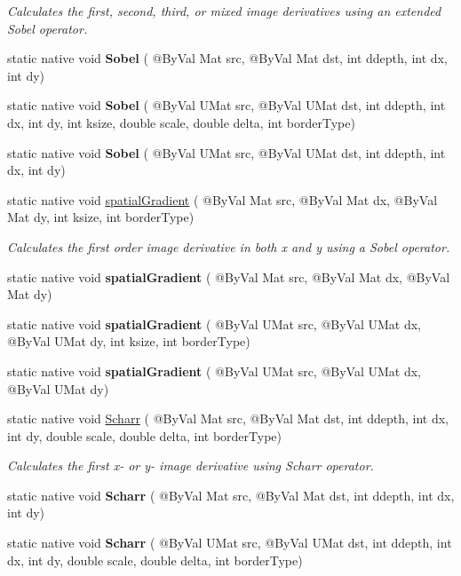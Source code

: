 \begin{DoxyCompactItemize}
\begin{DoxyCompactList}\small\item\em Calculates the first, second, third, or mixed image derivatives using an extended Sobel operator. \end{DoxyCompactList}\item 
static native void {\bfseries Sobel} ( @By\+Val Mat src, @By\+Val Mat dst, int ddepth, int dx, int dy)
\item 
static native void {\bfseries Sobel} ( @By\+Val U\+Mat src, @By\+Val U\+Mat dst, int ddepth, int dx, int dy, int ksize, double scale, double delta, int border\+Type)
\item 
static native void {\bfseries Sobel} ( @By\+Val U\+Mat src, @By\+Val U\+Mat dst, int ddepth, int dx, int dy)
\item 
static native void \hyperlink{group__imgproc__filter_ga9263e9262b1d9a29e4dc3180d4ee2683}{spatial\+Gradient} ( @By\+Val Mat src, @By\+Val Mat dx, @By\+Val Mat dy, int ksize, int border\+Type)
\begin{DoxyCompactList}\small\item\em Calculates the first order image derivative in both x and y using a Sobel operator. \end{DoxyCompactList}\item 
static native void {\bfseries spatial\+Gradient} ( @By\+Val Mat src, @By\+Val Mat dx, @By\+Val Mat dy)
\item 
static native void {\bfseries spatial\+Gradient} ( @By\+Val U\+Mat src, @By\+Val U\+Mat dx, @By\+Val U\+Mat dy, int ksize, int border\+Type)
\item 
static native void {\bfseries spatial\+Gradient} ( @By\+Val U\+Mat src, @By\+Val U\+Mat dx, @By\+Val U\+Mat dy)
\item 
static native void \hyperlink{group__imgproc__filter_gabd4c276a8055604be5e13e061eee74a1}{Scharr} ( @By\+Val Mat src, @By\+Val Mat dst, int ddepth, int dx, int dy, double scale, double delta, int border\+Type)
\begin{DoxyCompactList}\small\item\em Calculates the first x-\/ or y-\/ image derivative using Scharr operator. \end{DoxyCompactList}\item 
static native void {\bfseries Scharr} ( @By\+Val Mat src, @By\+Val Mat dst, int ddepth, int dx, int dy)
\item 
static native void {\bfseries Scharr} ( @By\+Val U\+Mat src, @By\+Val U\+Mat dst, int ddepth, int dx, int dy, double scale, double delta, int border\+Type)

\end{DoxyCompactItemize}
